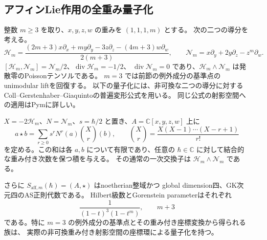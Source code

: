 \subsection{アフィンLie作用の全重み量子化}
\label{subsec:tangent-quantization-v33}

整数 $m\ge3$ を取り、$x,y,z,w$ の重みを $(1,1,1,m)$ とする。
次の二つの導分を考える。
\[
 \mathcal H_m=\frac{(2m+3)x\partial_x+my\partial_y-3z\partial_z
                   -(4m+3)w\partial_w}{2(m+3)},
 \qquad \mathcal N_m=x\partial_y+2y\partial_z-z^m\partial_w.
\]
$[\mathcal H_m,\mathcal N_m]=\mathcal N_m/2$、$\operatorname{div}\mathcal H_m=-1/2$、
$\operatorname{div}\mathcal N_m=0$ であり、$\mathcal H_m\wedge \mathcal N_m$ は発散零のPoissonテンソルである。
$m=3$ では前節の例外成分の基準点のunimodular liftを回復する。
以下の量子化には、非可換な二つの導分に対する
Coll--Gerstenhaber--Giaquintoの普遍変形公式を用いる。
同じ公式の射影空間への適用はPym\cite[\S3.6, \S4]{Pym}に詳しい。

\begin{theorem}[アフィン作用からの全重みAS正則族]
\label{thm:tangent-star-v33}
$X=-2\mathcal H_m$、$N=\mathcal N_m$、$s=\hbar/2$ と置き、$A=\mathbb C[x,y,z,w]$ 上に
\[
 a\star b=\sum_{r\ge0}s^r N^r(a)\binom{X}{r}(b),
 \qquad
 \binom{X}{r}=\frac{X(X-1)\cdots(X-r+1)}{r!}
\]
を定める。この和は各 $a,b$ について有限であり、任意の
$\hbar\in\mathbb C$ に対して結合的な重み付き次数を保つ積を与える。
その通常の一次交換子は $\mathcal H_m\wedge \mathcal N_m$ である。

さらに $S_{\mathrm{aff},m}(\hbar)=(A,\star)$ はnoetherian整域かつ
global dimension四、GK次元四のAS正則代数である。
Hilbert級数とGorenstein parameterはそれぞれ
\[
 \frac1{(1-t)^3(1-t^m)},\qquad m+3
\]
である。特に $m=3$ の例外成分の基準点とその重み付き座標変換から得られる族は、
実際の非可換重み付き射影空間の座標環による量子化を持つ。
\end{theorem}


